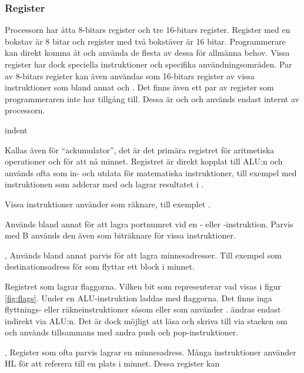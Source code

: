\documentclass[main.tex]{subfiles}
\begin{document}
\subsubsection{Register}
    Processorn har åtta 8-bitars register och tre 16-bitars register.  Register
    med en bokstav är 8 bitar och register med två bokstäver är 16 bitar.
    Programmerare kan direkt komma åt och använda de flesta av dessa för
    allmänna behov. Vissa register har dock speciella instruktioner och
    specifika användningsområden. Par av 8-bitars register kan även användas
    som 16-bitars register av vissa instruktioner som bland annat  och . Det finns även ett par av register som
    programmeraren inte har tillgång till. Dessa är  och  och
    används endast internt av processorn.
\begin{labeling}{indent}
\item[\mono{A}]
    Kallas även för ``ackumulator'', det är det primära registret för
    aritmetiska operationer och för att nå minnet. Registret är direkt kopplat
    till ALU:n och används ofta som in- och utdata för matematiska
    instruktioner, till exempel med instruktionen  som
    adderar  med  och lagrar resultatet i .
\item[\mono{B}]
    Vissa instruktioner använder  som räknare, till exemplet
    .
\item[\mono{C}]
    Används bland annat för att lagra portnumret vid en - eller
    -instruktion. Parvis med B används den även som biträknare för
    vissa instruktioner.
\item[\mono{D}, \mono{E}]
    Används bland annat parvis för att lagra minnesadresser. Till exempel som
    destinationsadress för  som flyttar ett block i minnet.
\item[\mono{F}]
    Registret som lagrar flaggorna. Vilken bit som representerar vad visas i
    figur \ref{fig:flags}. Under en ALU-instruktion laddas  med
    flaggorna. Det finns inga flyttnings- eller räkneinstruktioner såsom
     eller  som använder .  ändras endast
    indirekt via ALU:n. Det är dock möjligt att läsa och skriva till 
    via stacken om  och  används tillsammans med
    andra push och pop-instruktioner.
\item[\mono{H}, \mono{L}]
    Register som ofta parvis lagrar en minnesadress. Många instruktioner
    använder HL för att referera till en plats i minnet. Dessa register kan

\end{labeling}
\end{document}
